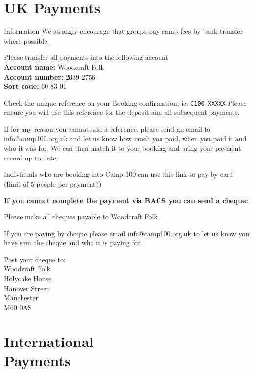 \documentclass[a4paper, 11pt]{report}
\begin{document}
\makedocumenttitlepage

\tableofcontents

\chapter{UK Payments}

\begin{callout-green}{Information}
We strongly encourage that groups pay camp fees by bank transfer where possible.
\end{callout-green}

Please transfer all payments into the following account\\
\textbf{Account name:} Woodcraft Folk\\
\textbf{Account number:} 2039 2756\\
\textbf{Sort code:} 60 83 01

Check the unique reference on your Booking confirmation, ie. \verb|C100-XXXXX| Please ensure you will use this reference for the deposit and all subsequent payments.

If for any reason you cannot add a reference, please send an email to info@camp100.org.uk and let us know how much you paid, when you paid it and who it was for. We can then match it to your booking and bring your payment record up to date.

Individuals who are booking into Camp 100 can use this link to pay by card (limit of 5 people per payment?)

\textbf{If you cannot complete the payment via BACS you can send a cheque:}

Please make all cheques payable to Woodcraft Folk

If you are paying by cheque please email info@camp100.org.uk to let us know you have sent the cheque and who it is paying for. 

Post your cheque to:\\
Woodcraft Folk\\
Holyoake House\\
Hanover Street\\
Manchester \\
M60 0AS\\

\chapter[International Payments]{International\\ Payments}
\end{document}

